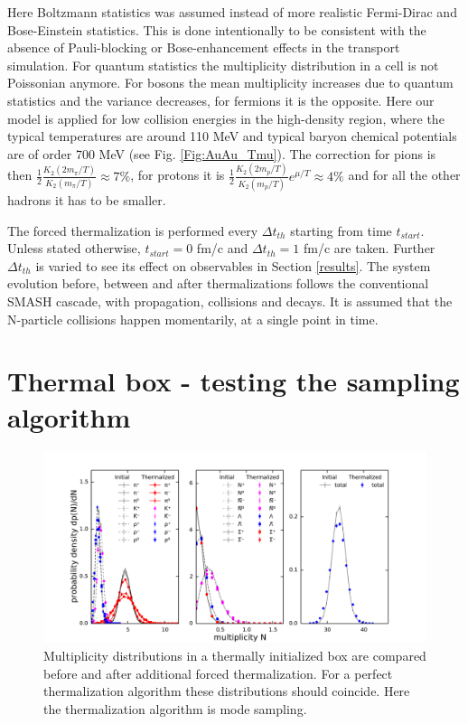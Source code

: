 Here Boltzmann statistics was assumed instead of more realistic Fermi-Dirac and
Bose-Einstein statistics. This is done intentionally to be consistent with the
absence of Pauli-blocking or Bose-enhancement effects in the transport
simulation. For quantum statistics the multiplicity distribution in a cell is
not Poissonian anymore. For bosons the mean multiplicity increases due to
quantum statistics and the variance decreases, for fermions it is the opposite.
Here our model is applied for low collision energies in the high-density region, where
the typical temperatures are around 110 MeV and typical baryon chemical
potentials are of order 700 MeV (see Fig. \ref{Fig:AuAu_Tmu}). The correction
for pions is then $\frac{1}{2} \frac{K_2(2m_{\pi}/T)}{K_2(m_{\pi}/T)} \approx 7
\%$, for protons it is $\frac{1}{2} \frac{K_2(2m_p/T)}{K_2(m_p/T)} e^{\mu/T}
\approx 4 \%$ and for all the other hadrons it has to be smaller.

The forced thermalization is performed every $\Delta t_{th}$ starting from time
$t_{start}$. Unless stated otherwise, $t_{start} = 0$ fm/c and $\Delta
t_{th} = 1$ fm/c are taken. Further $\Delta t_{th}$ is varied to see its effect on
observables in Section \ref{results}. The system evolution before, between and
after thermalizations follows the conventional SMASH cascade, with propagation,
collisions and decays. It is assumed that the N-particle collisions happen
momentarily, at a single point in time.

\section{Thermal box - testing the sampling algorithm}
\label{box_test}

\begin{figure}
  \includegraphics[width=\textwidth]{plots/forced_thermalization/modes_sampling.pdf}
  \caption{Multiplicity distributions in a thermally initialized box are
           compared before and after additional forced thermalization. For a perfect
           thermalization algorithm these distributions should coincide. Here the
           thermalization algorithm is mode sampling.}
  \label{Fig:modes_sampling}
\end{figure}

